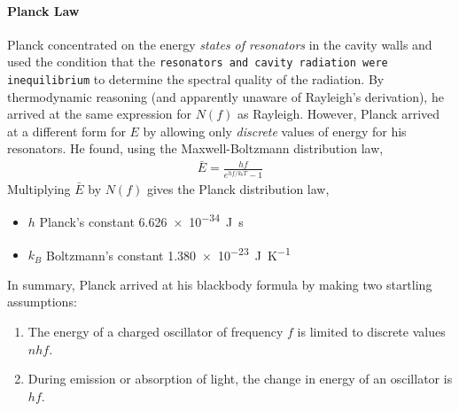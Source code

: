 \documentclass[a4paper]{report}
\begin{document}
            \paragraph{\color{c3}Planck Law} %
            \label{par:Planck Law}
            Planck concentrated on the energy \textit{states of resonators} in the cavity walls and used the condition that the 
            \texttt{resonators and cavity radiation were inequilibrium} to determine the spectral quality of the radiation. 
            By thermodynamic reasoning (and apparently unaware of Rayleigh’s derivation), he arrived at the same expression 
            for $N( f )$ as Rayleigh. However, Planck arrived at a different form for $E$ by allowing only \textit{discrete} values of 
            energy for his resonators. He found, using the Maxwell-Boltzmann distribution law,
            \begin{align}
                \label{eq:plank average energy}
                \bar{E} = \frac{hf}{e^{hf/k_b T}-1}
            \end{align}
            Multiplying $\bar{E}$ by $N(f)$ gives the Planck distribution law,
            {\tiny \begin{itemize}
                \item $h$ Planck's constant \SI{6.626e-34}{\J\s}
                \item $k_B$ Boltzmann's constant \SI{1.380e-23}{\J\per\K}
            \end{itemize}}
            \noindent
            In summary, Planck arrived at his blackbody formula by making two startling assumptions: 
            \begin{enumerate}
                \item The energy of a charged oscillator of frequency $f$ is limited to discrete values $nhf$.
                \item During emission or absorption of light, the change in energy of an oscillator is $hf$.
            \end{enumerate}
            
\end{document}
